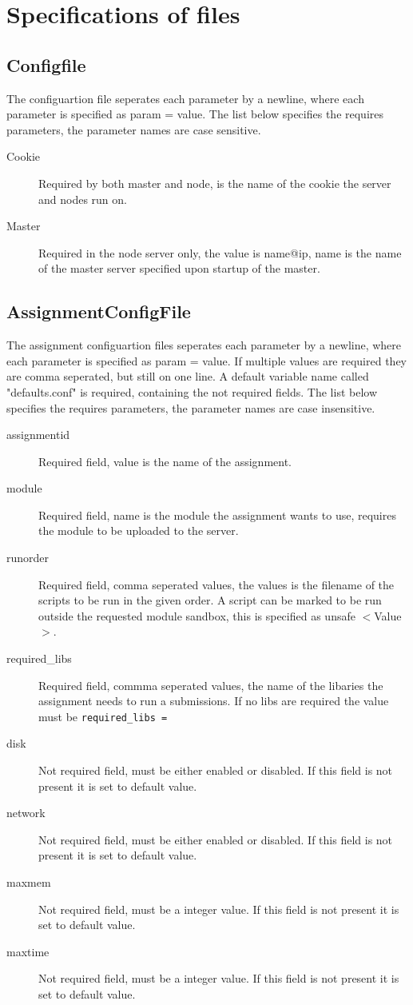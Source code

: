 \section{Specifications of files}
\subsection{Configfile}
\label{sec:config}
The configuartion file seperates each parameter by a newline, where each parameter is specified as param = value.
The list below specifies the requires parameters, the parameter names are case sensitive.
\begin{description}
    \item[Cookie] Required by both master and node, is the name of the cookie the server and nodes run on.
    \item[Master] Required in the node server only, the value is name@ip, name is the name of the master server specified upon startup of the master.
\end{description}
\subsection{AssignmentConfigFile}
\label{sec:assignment}
The assignment configuartion files seperates each parameter by a newline, where each parameter is specified as param = value. If multiple values are required they are comma seperated, but still on one line. A default variable name called "defaults.conf" is required, containing the not required fields.
The list below specifies the requires parameters, the parameter names are case insensitive.
\begin{description}
    \item [assignmentid] Required field, value is the name of the assignment.
    \item [module] Required field, name is the module the assignment wants to use, requires the module to be uploaded to the server.
    \item [runorder] Required field, comma seperated values, the values is the filename of the scripts to be run in the given order. A script can be marked to be run outside the requested module sandbox, this is specified as unsafe $<$Value$>$.
    \item [required\_libs] Required field, commma seperated values, the name of the libaries the assignment needs to run a submissions. If no libs are required the value must be \texttt{required\_libs =}
    \item [disk] Not required field, must be either enabled or disabled. If this field is not present it is set to default value.
    \item [network] Not required field, must be either enabled or disabled. If this field is not present it is set to default value.
    \item [maxmem] Not required field, must be a integer value. If this field is not present it is set to default value.
    \item [maxtime] Not required field, must be a integer value. If this field is not present it is set to default value.
\end{description}
